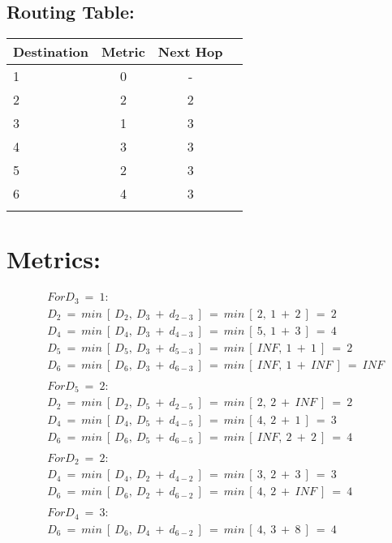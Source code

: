 \documentclass[10pt,a4paper]{article}
\begin{document}
\subsection{Routing Table:}


\begin{center}
\begin{tabular}[.5cm]{l c c c}
\toprule
Destination & Metric & Next Hop \\
\midrule
1 & 0 & - \\
\cmidrule{1-3}
2 & 2 & 2 \\
\cmidrule{1-3}
3 & 1 & 3 \\
\cmidrule{1-3}
4 & 3 & 3 \\
\cmidrule{1-3}
5 & 2 & 3 \\
\cmidrule{1-3}
6 & 4 & 3 \\
\bottomrule
\linebreak
\end{tabular}
\end{center} 

\pagebreak

\section{Metrics:}

\begin{equation} 
\begin{split}
& For D_{3}\ =\ 1: \\
& D_{2}\ =\ min\ [\ D_{2},\ D_{3}\ +\ d_{2-3}\ ]\ =\ min\ [\ 2,\ 1\ +\ 2\ ]\ =\ 2 \\
& D_{4}\ =\ min\ [\ D_{4},\ D_{3}\ +\ d_{4-3}\ ]\ =\ min\ [\ 5,\ 1\ +\ 3\ ]\ =\ 4 \\
& D_{5}\ =\ min\ [\ D_{5},\ D_{3}\ +\ d_{5-3}\ ]\ =\ min\ [\ INF,\ 1\ +\ 1\ ]\ =\ 2 \\
& D_{6}\ =\ min\ [\ D_{6},\ D_{3}\ +\ d_{6-3}\ ]\ =\ min\ [\ INF,\ 1\ +\ INF\ ]\ =\ INF \\ 
& \\
& For D_{5}\ =\ 2: \\
& D_{2}\ =\ min\ [\ D_{2},\ D_{5}\ +\ d_{2-5}\ ]\ =\ min\ [\ 2,\ 2\ +\ INF\ ]\ =\ 2 \\
& D_{4}\ =\ min\ [\ D_{4},\ D_{5}\ +\ d_{4-5}\ ]\ =\ min\ [\ 4,\ 2\ +\ 1\ ]\ =\ 3 \\
& D_{6}\ =\ min\ [\ D_{6},\ D_{5}\ +\ d_{6-5}\ ]\ =\ min\ [\ INF,\ 2\ +\ 2\ ]\ =\ 4 \\
& \\
& For D_{2}\ =\ 2: \\
& D_{4}\ =\ min\ [\ D_{4},\ D_{2}\ +\ d_{4-2}\ ]\ =\ min\ [\ 3,\ 2\ +\ 3\ ]\ =\ 3 \\
& D_{6}\ =\ min\ [\ D_{6},\ D_{2}\ +\ d_{6-2}\ ]\ =\ min\ [\ 4,\ 2\ +\ INF\ ]\ =\ 4 \\
& \\
& For D_{4}\ =\ 3: \\
& D_{6}\ =\ min\ [\ D_{6},\ D_{4}\ +\ d_{6-2}\ ]\ =\ min\ [\ 4,\ 3\ +\ 8\ ]\ =\ 4 \\
\end{split}
\end{equation}
\end{document}
